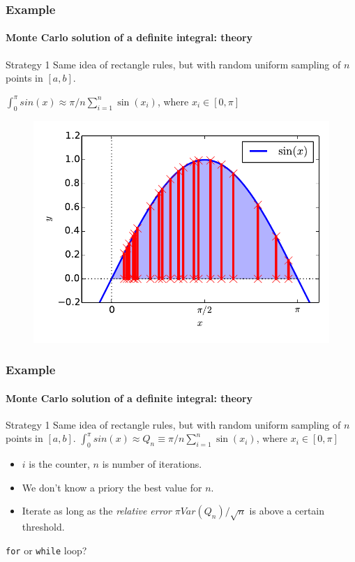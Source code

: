 \documentclass[12pt]{beamer}
\begin{document}
\begin{frame}
  \frametitle{Example}
  \framesubtitle{Monte Carlo solution of a definite integral: theory}
\begin{block}{Strategy 1}
Same idea of rectangle rules, but with random uniform sampling of $n$ points in $[a,b]$.

$\int_0^\pi sin(x) \approx \pi/n \sum_{i=1}^{n} \sin(x_i)$,
    where $x_i \in [0,\pi] $
\end{block}
  \begin{figure}
    \includegraphics[height=0.7\textheight]{../figures/montecarlo2}
  \end{figure}
\end{frame}

\begin{frame}
  \frametitle{Example}
  \framesubtitle{Monte Carlo solution of a definite  integral: theory}
\begin{block}{Strategy 1}
Same idea of rectangle rules, but with random uniform sampling of $n$ points in $[a,b]$.
$\int_0^\pi sin(x) \approx Q_n \equiv \pi/n \sum_{i=1}^{n} \sin(x_i)$,
    where $x_i \in [0,\pi] $
\end{block}

\begin{itemize}
    \item $i$ is the counter, $n$ is number of iterations.
    \item We don't know a priory the best value for $n$.
    \item Iterate as long as the \textit{relative error} $\pi Var(Q_n)/\sqrt{n}$ is above a certain threshold. 
\end{itemize}

\lstinline/for/ or \lstinline/while/ loop?

\end{frame}
\end{document}
